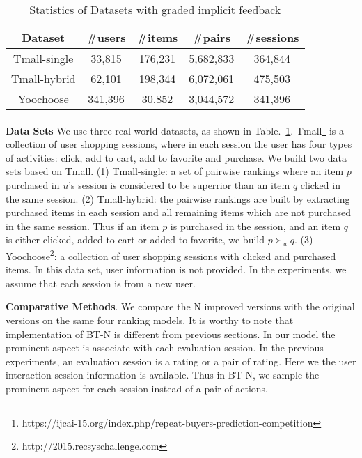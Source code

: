 \documentclass[letterpaper]{article} %
\begin{document}
\begin{table}[htp]
\tiny
\caption{Statistics of Datasets with graded implicit feedback}
\begin{center}
\begin{tabular}{|c|c|c|c|c|}
\hline
Dataset & \#users & \#items & \#pairs & \#sessions \\\hline
Tmall-single &33,815 &176,231 &5,682,833 &364,844 \\\hline
Tmall-hybrid &62,101 &198,344 &6,072,061 &475,503 \\\hline
Yoochoose &341,396 &30,852 &3,044,572 &341,396 \\\hline
\end{tabular}
\end{center}
\label{tab:idata}
\end{table}%

\textbf{Data Sets}  We use three real world datasets, as shown in Table.~\ref{tab:idata}. Tmall\footnote{https://ijcai-15.org/index.php/repeat-buyers-prediction-competition} is a collection of user shopping sessions, where in each session the user has four types of activities: click, add to cart, add to favorite and purchase. We build two data sets based on Tmall. (1) Tmall-single: a set of pairwise rankings where an item $p$ purchased in $u$'s session is considered to be superrior than an item $q$ clicked in the same session. (2) Tmall-hybrid: the pairwise rankings are built by extracting purchased items in each session and all remaining items which are not purchased in the same session. Thus if an item $p$ is purchased in the session, and an item $q$ is either clicked, added to cart or added to favorite, we build $p\succ_u q$. (3) Yoochoose\footnote{http://2015.recsyschallenge.com}: a collection of user shopping sessions with clicked and purchased items. In this data set, user information is not provided. In the experiments, we assume that each session is from a new user. %


\textbf{Comparative Methods}. We compare the N improved versions with the original versions on the same four ranking models. It is worthy to note that implementation of BT-N is different from previous sections.  In our model the prominent aspect is associate with each evaluation session. In the previous experiments, an evaluation session is a rating or a pair of rating. Here we the user interaction session information is available. Thus in BT-N, we sample the prominent aspect for each session instead of a pair of actions.  
\end{document}

